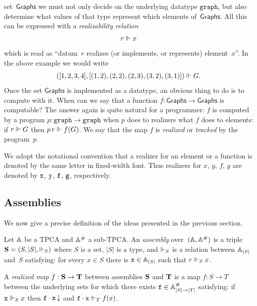 set~$\mathsf{Graphs}$ we must not only decide on the underlying
datatype $\mathtt{graph}$, but also determine what values of that type
represent which elements of~$\mathsf{Graphs}$. All this can be
expressed with a \emph{realizability relation}
%
\begin{equation*}
  r \rz x
\end{equation*}
%
which is read as ``datum~$r$ realizes (or implements, or represents)
element~$x$''. In the above example we would write
%
\begin{equation*}
([1, 2, 3, 4], [(1,2), (2,2), (2,3), (3,2), (3,1)]) \rz G.
\end{equation*}
%
Once the set $\mathsf{Graphs}$ is implemented as a datatype, an
obvious thing to do is to compute with it. When can we say that a
function $f : \mathsf{Graphs} \to \mathsf{Graphs}$ is computable? The
answer again is quite natural for a programmer: $f$ is computed by a
program $p : \mathtt{graph} \to \mathtt{graph}$ when $p$ does to
realizers what $f$ does to elements: if $r \rz G$ then $p \, r \rz
f(G)$. We say that the map $f$ is \emph{realized} or \emph{tracked} by
the program~$p$.

We adopt the notational convention that a realizer for an element or a
function is denoted by the same letter in fixed-width font. Thus
realizers for $x$, $y$, $f$, $g$ are denoted by $\R{x}$, $\R{y}$,
$\R{f}$, $\R{g}$, respectively.

\subsection{Assemblies}
\label{sec:assemblies}

We now give a precise definition of the ideas presented in the
previous section.

\begin{definition}[Assemblies]
  Let $\AA$ be a TPCA and $\compAA$ a sub-TPCA. An \emph{assembly}
  over~$(\AA, \compAA)$ is a triple $\asm{S} = \xasm{S}$ where $S$ is
  a set, $|S|$ is a type, and $\rz_S$ is a relation between
  $\xAtyp{S}$ and~$S$ satisfying: for every $x \in S$ there is $\R{x}
  \in \xAtyp{S}$ such that $r \rz_S x$.

  A \emph{realized map} $f : \asm{S} \to \asm{T}$ between assemblies
  $\asm{S}$ and $\asm{T}$ is a map $f : S \to T$ between the
  underlying sets for which there exists $\R{f} \in \compAtyp{|S| \to
    |T|}$ satisfying: if $\R{x} \rz_S x$ then $\defined{\R{f} \cdot
    \R{x}}$ and $\R{f} \cdot \R{x} \rz_T f(x)$.
\end{definition}

